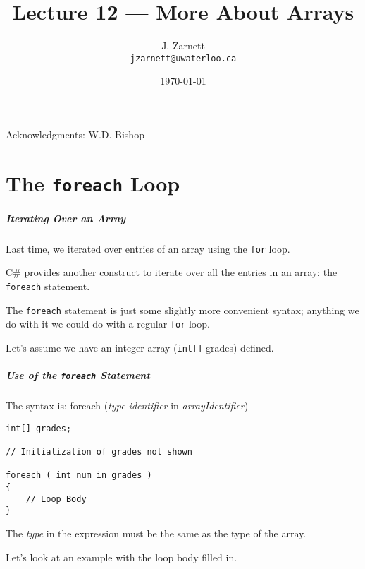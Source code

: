 

\title{Lecture 12 --- More About Arrays }

\author{J. Zarnett\\
\texttt{jzarnett@uwaterloo.ca}}
\date{\today}



\begin{frame}
  \titlepage
  
  \begin{center}
  \small{Acknowledgments: W.D. Bishop}
  \end{center}
 \end{frame}
 

\part{The \texttt{foreach} Loop}
\begin{frame}\partpage\end{frame}


\begin{frame}
\frametitle{Iterating Over an Array}

Last time, we iterated over entries of an array using the \texttt{for} loop.

C\# provides another construct to iterate over all the entries in an array: the \texttt{foreach} statement.

The \texttt{foreach} statement is just some slightly more convenient syntax; anything we do with it we could do with a regular \texttt{for} loop.

Let's assume we have an integer array (\texttt{int[]} grades) defined.

\end{frame}

\begin{frame}[fragile]
\frametitle{Use of the \texttt{foreach} Statement}

The syntax is: foreach (\textit{type identifier} in \textit{arrayIdentifier})

\begin{verbatim}
int[] grades;

// Initialization of grades not shown

foreach ( int num in grades )
{
    // Loop Body
}
\end{verbatim}

The \textit{type} in the expression must be the same as the type of the array.

Let's look at an example with the loop body filled in.

\end{frame}


